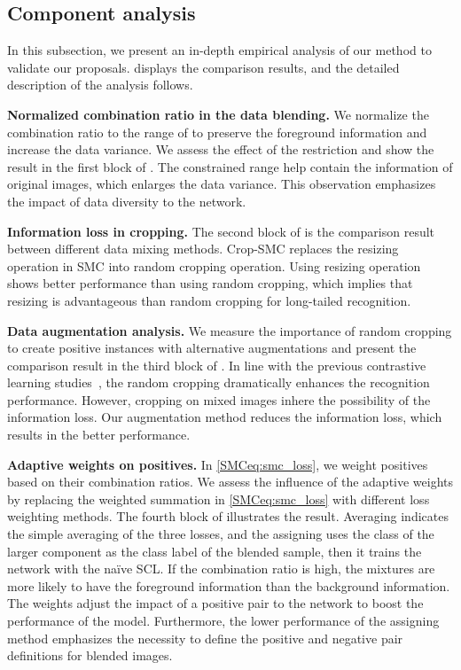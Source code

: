 \documentclass[10pt,twocolumn,letterpaper]{article}
\begin{document}
\subsection{Component analysis}
In this subsection, we present an in-depth empirical analysis of our method to validate our proposals.
 displays the comparison results, and the detailed description of the analysis follows.

\textbf{Normalized combination ratio in the data blending.}
We normalize the combination ratio to the range of  to preserve the foreground information and increase the data variance. We assess the effect of the restriction and show the result in the first block of . The constrained range help contain the information of original images, which enlarges the data variance. This observation emphasizes the impact of data diversity to the network.

\textbf{Information loss in cropping.}
The second block of  is the comparison result between different data mixing methods. Crop-SMC replaces the resizing operation in SMC into random cropping operation.
Using resizing operation shows better performance than using random cropping, which implies that resizing is advantageous than random cropping for long-tailed recognition.


\textbf{Data augmentation analysis.}
We measure the importance of random cropping to create positive instances with alternative augmentations and present the comparison result in the third block of .
In line with the previous contrastive learning studies~\cite{chen2020simple}, the random cropping dramatically enhances the recognition performance. However, cropping on mixed images inhere the possibility of the information loss. Our augmentation method reduces the information loss, which results in the better performance.

\textbf{Adaptive weights on positives.}
In \cref{SMCeq:smc_loss}, we weight positives based on their combination ratios.
We assess the influence of the adaptive weights by replacing the weighted summation in \cref{SMCeq:smc_loss} with different loss weighting methods. The fourth block of  illustrates the result.
Averaging indicates the simple averaging of the three losses, and the assigning uses the class of the larger component as the class label of the blended sample, then it trains the network with the na\"ive SCL.
If the combination ratio is high, the mixtures are more likely to have the foreground information than the background information.
The weights adjust the impact of a positive pair to the network to boost the performance of the model.
Furthermore, the lower performance of the assigning method emphasizes the necessity to define the positive and negative pair definitions for blended images.
\end{document}
